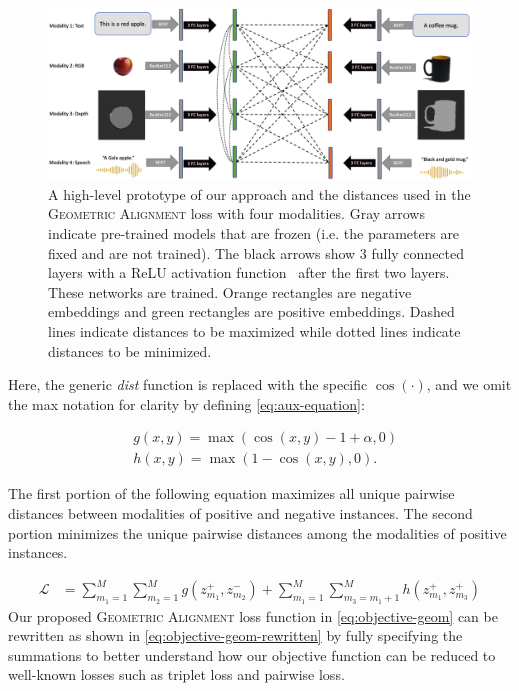 \documentclass[10pt]{article} %
\newcommand{\geom}{\textsc{Geometric Alignment}}
\begin{document}
\begin{figure}[tb]
\centering
\includegraphics[width=1\columnwidth]{Figures/emma-loss-trimmed.pdf}
\caption{A high-level prototype of our approach and the distances used in the \geom{} loss with four modalities. Gray arrows indicate pre-trained models that are frozen (i.e. the parameters are fixed and are not trained). The black arrows show 3 fully connected layers with a ReLU activation function~\citep{relu2010} after the first two layers. These networks are trained.
Orange rectangles are negative embeddings and green rectangles are positive embeddings.
Dashed lines indicate distances to be maximized while dotted lines indicate distances to be minimized.%
}
\label{fig:emma-loss-trimmed}
\end{figure}


Here, the generic \textit{dist} function is replaced with the specific $\cos(\cdot)$, and we omit the max notation for clarity by defining \cref{eq:aux-equation}:

\begin{equation}\label{eq:aux-equation}
    \begin{split}
        & g(x,y) = \max(\cos(x,y)-1 + \alpha, 0 ) \\
        & h(x,y) = \max(1- \cos(x,y), 0 ).
    \end{split}
\end{equation}


The first portion of the following equation maximizes all unique pairwise distances between modalities of positive and negative instances. The second portion minimizes the unique pairwise distances among the modalities of positive instances.

\begin{equation}\label{eq:objective-geom}
\begin{split}
    \mathcal{L} & = \sum_{m_1=1}^{M}  \sum_{m_2=1}^{M} g(z_{m_1}^{+}, z_{m_2}^{-})  + \sum_{m_1=1}^{M} \sum_{m_3=m_1+1}^{M} h(z_{m_1}^{+},z_{m_3}^{+})
\end{split}    
\end{equation}
Our proposed \geom{} loss function in \cref{eq:objective-geom} can be rewritten as shown in \cref{eq:objective-geom-rewritten} by fully specifying the summations to better understand how our objective function can be reduced to well-known losses such as triplet loss and pairwise loss.
\end{document}
